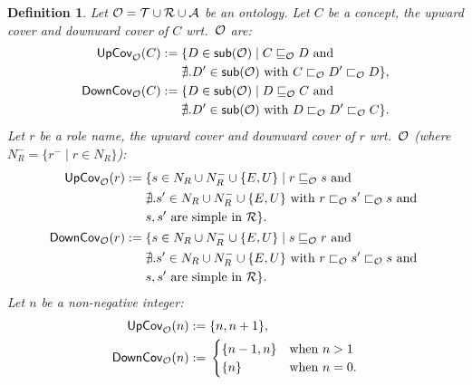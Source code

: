 \documentclass[
]{ceurart}
\newtheorem{definition}{Definition}
\begin{document}
\begin{definition}
\label{def:cover}
Let $\mathcal{O} = \mathcal{T} \cup \mathcal{R} \cup \mathcal{A}$ be an ontology. Let $C$ be a concept, the {\em upward cover} and {\em downward cover} of $C$ wrt.\ $\mathcal{O}$ are:
\begin{align}
\mathsf{UpCov}_{\mathcal{O}}(C) := {} &\{ D \in \mathop{\mathsf{sub}}(\mathcal{O})  \mid 
	C \sqsubseteq_{\mathcal{O}} D \text{ and} \nonumber \\ & 
	\nexists. D' \in \mathop{\mathsf{sub}}(\mathcal{O}) \text{ with } C \sqsubset_{\mathcal{O}} D' \sqsubset_{\mathcal{O}} D\} ,\nonumber \\
\mathsf{DownCov}_{\mathcal{O}}(C) := {} &\{ D \in \mathop{\mathsf{sub}}(\mathcal{O}) \mid 
	D \sqsubseteq_{\mathcal{O}} C  \text{ and}  \nonumber\\ &
	\nexists. D' \in \mathop{\mathsf{sub}}(\mathcal{O}) \text{ with } D \sqsubset_{\mathcal{O}} D' \sqsubset_{\mathcal{O}} C \}. \nonumber 
\end{align}
Let $r$ be a role \emph{name}, the {\em upward cover} and {\em downward cover} of $r$ wrt.\ $\mathcal{O}$ (where $N^-_R = \{r^- \mid r \in N_R\}$): %
\begin{align}
\mathsf{UpCov}_{\mathcal{O}}(r) := {} &\{ s \in N_R \cup N_{R}^{-} \cup \{E, U\} \mid 
	r \sqsubseteq_{\mathcal{O}} s  \text{ and}  \nonumber\\ &
	\nexists. s' \in N_R \cup N_{R}^{-} \cup \{E, U\} \text{ with } r \sqsubset_{\mathcal{O}} s' \sqsubset_{\mathcal{O}} s \text{ and } \nonumber \\
	& s, s' \text{ are simple in } \mathcal{R}\}. \nonumber \\
\mathsf{DownCov}_{\mathcal{O}}(r) := {} &\{ s \in N_R \cup N_{R}^{-} \cup \{E, U\} \mid 
	s \sqsubseteq_{\mathcal{O}} r  \text{ and}  \nonumber\\ &
	\nexists. s' \in N_R \cup N_{R}^{-} \cup \{E, U\} \text{ with } r \sqsubset_{\mathcal{O}} s' \sqsubset_{\mathcal{O}} s \text{ and} \nonumber \\
	& s, s' \text{ are simple in } \mathcal{R}\}. \nonumber
\end{align}
Let $n$ be a non-negative integer:
\begin{align}
\mathsf{UpCov}_{\mathcal{O}}(n) := {} & \{n, n+1\}, \nonumber \\
\mathsf{DownCov}_{\mathcal{O}}(n) := {} & \begin{cases}
\{n-1, n\} & \text{when } n > 1\\
\{ n\} & \text{when } n = 0 .
\end{cases} \nonumber
\end{align}
\end{definition}
%
\end{document}
